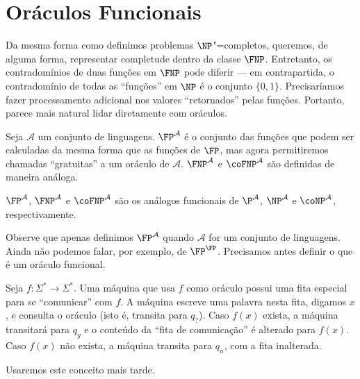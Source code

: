 \section{Oráculos Funcionais}

Da mesma forma como definimos problemas $\NP$"=completos,
queremos, de alguma forma,
representar completude dentro da classe $\FNP$.
Entretanto,
os contradomínios de duas funções em $\FNP$ pode diferir
--- em contrapartida,
o contradomínio de todas as ``funções'' em $\NP$ é o conjunto $\{0, 1\}$.
Precisaríamos fazer processamento adicional
nos valores ``retornados'' pelas funções.
Portanto,
parece mais natural lidar diretamente com oráculos.

\begin{definition}
    Seja $\mathcal A$ um conjunto de linguagens.
    $\FP^\mathcal A$ é o conjunto das funções
    que podem ser calculadas da mesma forma que as funções de $\FP$,
    mas agora permitiremos chamadas ``gratuitas'' a um oráculo de $\mathcal A$.
    $\FNP^\mathcal A$ e $\coFNP^\mathcal A$
    são definidas de maneira análoga.
\end{definition}

$\FP^\mathcal A$, $\FNP^\mathcal A$ e $\coFNP^\mathcal A$
são os análogos funcionais de
$\P^\mathcal A$, $\NP^\mathcal A$ e $\coNP^\mathcal A$,
respectivamente.

Observe que apenas definimos $\FP^\mathcal A$
quando $\mathcal A$ for um conjunto de linguagens.
Ainda não podemos falar, por exemplo, de $\FP^\FP$.
Precisamos antes definir o que é um oráculo funcional.

\begin{definition}
    Seja $f : \Sigma^* \rightarrow \Sigma^*$.
    Uma máquina que usa $f$ como oráculo
    possui uma fita especial para se ``comunicar'' com $f$.
    A máquina escreve uma palavra nesta fita,
    digamos $x$,
    e consulta o oráculo
    (isto é, transita para $q_?$).
    Caso $f(x)$ exista,
    a máquina transitará para $q_y$
    e o conteúdo da ``fita de comunicação'' é alterado para $f(x)$.
    Caso $f(x)$ não exista,
    a máquina transita para $q_n$,
    com a fita inalterada.
\end{definition}

Usaremos este conceito mais tarde.


